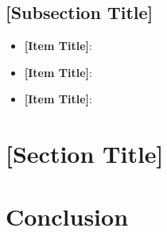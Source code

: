 \documentclass[a4paper,12pt]{article}
\begin{document}
\subsection{{[Subsection Title]}}
\begin{itemize}[left=1em, itemsep=0pt, topsep=0pt] 
    \item \textbf{[Item Title]}: \lipsum[17][1-2]
    \item \textbf{[Item Title]}: \lipsum[17][3-4]
    \item \textbf{[Item Title]}: \lipsum[17][5-6]
\end{itemize}

\newpage

\section{{[Section Title]}}
\label{sec:section6}

\lipsum[18-19]

\begin{center}
\label{tab:example_table2}
\end{center}

\newpage 

\section{{Conclusion}} \label{sec:conclusion}

\lipsum[20]

\label{MyLastPage}
\end{document}
